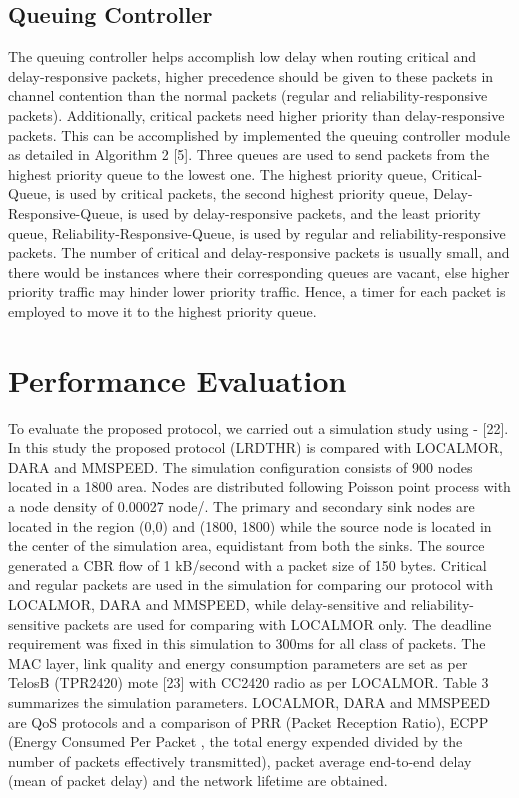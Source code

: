 \documentclass[fleqn,twoside]{article}
\begin{document}
\subsection{Queuing Controller}
The queuing controller helps accomplish low delay when routing critical and delay-responsive packets, higher precedence 
should be given to these packets in channel contention than the normal packets (regular and reliability-responsive packets). 
Additionally, critical packets need higher priority than delay-responsive
packets. This can be accomplished by implemented the queuing controller
module as detailed in Algorithm 2 [5]. Three queues are used to send packets from the highest priority queue to the lowest one. 
The highest priority queue, Critical-Queue, is used by critical packets, the second highest priority queue, Delay-Responsive-Queue,
is used by delay-responsive packets, and the least priority queue,
Reliability-Responsive-Queue, is used by regular and reliability-responsive packets. The
number of critical and delay-responsive packets is usually small, and there would be instances where their corresponding queues
are vacant, else higher priority traffic may hinder lower priority traffic.
Hence, a timer for each packet is employed to move it to the highest priority queue.

 \section{Performance Evaluation}

To evaluate the proposed protocol, we carried out a simulation study using - [22]. In this study the proposed protocol 
(LRDTHR) is compared with LOCALMOR, DARA and MMSPEED. The simulation configuration consists of 900 nodes 
located in a 1800  area. Nodes are distributed following Poisson point process with a node density of 0.00027 node/. The 
primary and secondary sink nodes are located in the region (0,0) and (1800, 1800) while the source node is located in the center
of the simulation area, equidistant from both the sinks. The source generated a CBR flow of 1 kB/second with a packet size of 
150 bytes. Critical and regular packets are used in the simulation for comparing our protocol with LOCALMOR, DARA and MMSPEED, 
while delay-sensitive and reliability-sensitive packets are used for comparing with LOCALMOR only. The deadline requirement was 
fixed in this simulation to 300ms for all class of packets.
\vskip 2mm
The MAC layer, link quality and energy consumption parameters are
set as per TelosB (TPR2420) mote [23] with CC2420 radio as per LOCALMOR. Table 3 summarizes the simulation parameters.
LOCALMOR, DARA and MMSPEED are QoS protocols and a comparison of PRR (Packet Reception Ratio), 
ECPP (Energy Consumed Per Packet , the total energy expended divided by the number of packets effectively transmitted), 
packet average end-to-end delay (mean of packet delay) and the network lifetime are obtained.
\end{document}
